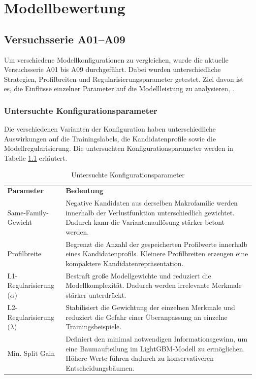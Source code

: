 \chapter{Modellbewertung}\label{chap:modellbewertung}

\section{Versuchsserie A01--A09}

Um verschiedene Modellkonfigurationen zu vergleichen, wurde die aktuelle Versuchsserie A01 bis A09 durchgeführt. 
Dabei wurden unterschiedliche Strategien, Profilbreiten und Regularisierungsparameter getestet. Ziel davon ist es, die Einflüsse einzelner Parameter auf die Modellleistung zu analysieren, \parencite{LTR_Configuration_Test_Series}.

\subsection{Untersuchte Konfigurationsparameter}

Die verschiedenen Varianten der Konfiguration haben unterschiedliche Auswirkungen auf die Trainingslabels, die Kandidatenprofile sowie die Modellregularisierung. 
Die untersuchten Konfigurationsparameter werden in Tabelle \ref{tab:konfigurationsparameter} erläutert.

\begin{table}[H] 
    \centering 
    \caption{Untersuchte Konfigurationsparameter} 
    \label{tab:konfigurationsparameter} 
    \begin{tabularx}{\textwidth}{p{4cm}X} 
        \toprule \textbf{Parameter} & \textbf{Bedeutung} \\ 
        Same-Family-Gewicht &  Negative Kandidaten aus derselben Makrofamilie werden innerhalb der Verlustfunktion unterschiedlich gewichtet. Dadurch kann die Variantenauflösung stärker betont werden. \\ 
        Profilbreite & Begrenzt die Anzahl der gespeicherten Profilwerte innerhalb eines Kandidatenprofils. Kleinere Profilbreiten erzeugen eine kompaktere Kandidatenrepräsentation. \\ 
        L1-Regularisierung ($\alpha$) & Bestraft große Modellgewichte und reduziert die Modellkomplexität. Dadurch werden irrelevante Merkmale stärker unterdrückt. \\ 
        L2-Regularisierung ($\lambda$) & Stabilisiert die Gewichtung der einzelnen Merkmale und reduziert die Gefahr einer Überanpassung an einzelne Trainingsbeispiele. \\ 
        Min. Split Gain & Definiert den minimal notwendigen Informationsgewinn, um eine Baumaufteilung im LightGBM-Modell zu ermöglichen. Höhere Werte führen dadurch zu konservativeren Entscheidungsbäumen. \\ 
        \bottomrule 
    \end{tabularx} 
\end{table} 

